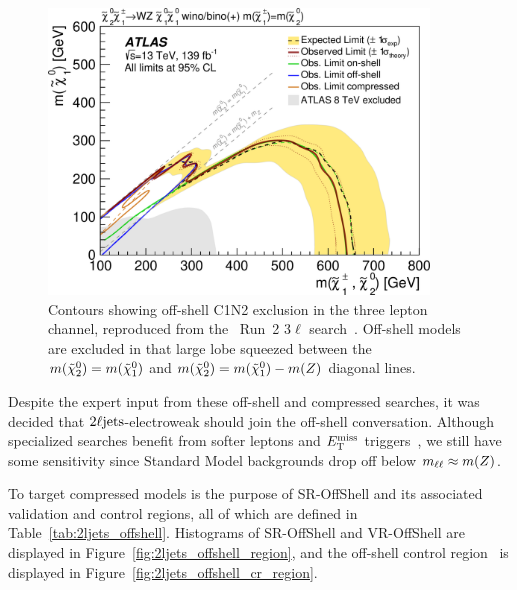 \begin{figure}[tp]
\centering
\includegraphics[width=0.9\textwidth]{figures/2ljets_compressed_3l_ins1866951_fig_16a.png}
\caption[
Contours showing off-shell C1N2 exclusion from the \atlas\ Run~2 $3\ell$ search
]{%
Contours showing off-shell C1N2 exclusion in the three lepton channel,
reproduced from the \atlas\ Run~2 $3\ell$
search~\cite{atlas_rjr_3l_SUSY_2019_09, hepdata.95751}.
Off-shell models are excluded in that large lobe squeezed between the
$m(\tilde\chi^0_2) = m(\tilde\chi^0_1)$ and
$m(\tilde\chi^0_2) = m(\tilde\chi^0_1) - m(Z)$ diagonal lines.
}
\label{fig:ljets_offshell_3l_exclusion}
\end{figure}

Despite the expert input from these off-shell and compressed searches, it was
decided that $2\ell\mathrm{jets}$-electroweak should join the off-shell
conversation.
Although specialized searches benefit from softer leptons and $E_\mathrm{T}^\mathrm{miss}$
triggers~\cite{atlas_susy_compressed_2l_2018_run2},
we still have some sensitivity since Standard Model backgrounds drop off
below $m_{\ell\ell} \approx m(Z)$.

To target compressed models is the purpose of SR-OffShell and its associated
validation and control regions, all of which are defined in
Table~\ref{tab:2ljets_offshell}.
Histograms of SR-OffShell and VR-OffShell are displayed in
Figure~\ref{fig:2ljets_offshell_region}, and the off-shell control region
\crdy\ is displayed in Figure~\ref{fig:2ljets_offshell_cr_region}.

